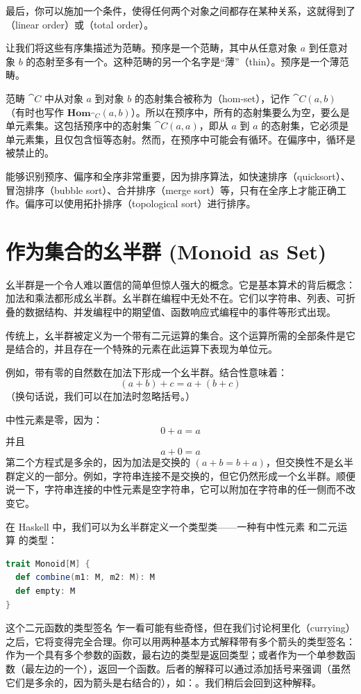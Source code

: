 最后，你可以施加一个条件，使得任何两个对象之间都存在某种关系，这就得到了（linear order）或（total order）。

让我们将这些有序集描述为范畴。预序是一个范畴，其中从任意对象 $a$ 到任意对象 $b$ 的态射至多有一个。这种范畴的另一个名字是“薄”（thin）。预序是一个薄范畴。

范畴 $\cat{C}$ 中从对象 $a$ 到对象 $b$ 的态射集合被称为（hom-set），记作 $\cat{C}(a, b)$（有时也写作 $\mathbf{Hom}_{\cat{C}}(a, b)$）。所以在预序中，所有的态射集要么为空，要么是单元素集。这包括预序中的态射集 $\cat{C}(a, a)$，即从 $a$ 到 $a$ 的态射集，它必须是单元素集，且仅包含恒等态射。然而，在预序中可能会有循环。在偏序中，循环是被禁止的。

能够识别预序、偏序和全序非常重要，因为排序算法，如快速排序（quicksort）、冒泡排序（bubble sort）、合并排序（merge sort）等，只有在全序上才能正确工作。偏序可以使用拓扑排序（topological sort）进行排序。

\section{作为集合的幺半群 (Monoid as Set)}

幺半群是一个令人难以置信的简单但惊人强大的概念。它是基本算术的背后概念：加法和乘法都形成幺半群。幺半群在编程中无处不在。它们以字符串、列表、可折叠的数据结构、并发编程中的期望值、函数响应式编程中的事件等形式出现。

传统上，幺半群被定义为一个带有二元运算的集合。这个运算所需的全部条件是它是结合的，并且存在一个特殊的元素在此运算下表现为单位元。

例如，带有零的自然数在加法下形成一个幺半群。结合性意味着：
\[(a + b) + c = a + (b + c)\]
（换句话说，我们可以在加法时忽略括号。）

中性元素是零，因为：
\[0 + a = a\]
并且
\[a + 0 = a\]
第二个方程式是多余的，因为加法是交换的 $(a + b = b + a)$，但交换性不是幺半群定义的一部分。例如，字符串连接不是交换的，但它仍然形成一个幺半群。顺便说一下，字符串连接的中性元素是空字符串，它可以附加在字符串的任一侧而不改变它。

在 Haskell 中，我们可以为幺半群定义一个类型类——一种有中性元素  和二元运算  的类型：

\begin{lstlisting}[language=Scala]
trait Monoid[M] {
  def combine(m1: M, m2: M): M
  def empty: M
}
\end{lstlisting}
这个二元函数的类型签名  乍一看可能有些奇怪，但在我们讨论柯里化（currying）之后，它将变得完全合理。你可以用两种基本方式解释带有多个箭头的类型签名：作为一个具有多个参数的函数，最右边的类型是返回类型；或者作为一个单参数函数（最左边的一个），返回一个函数。后者的解释可以通过添加括号来强调（虽然它们是多余的，因为箭头是右结合的），如：。我们稍后会回到这种解释。

